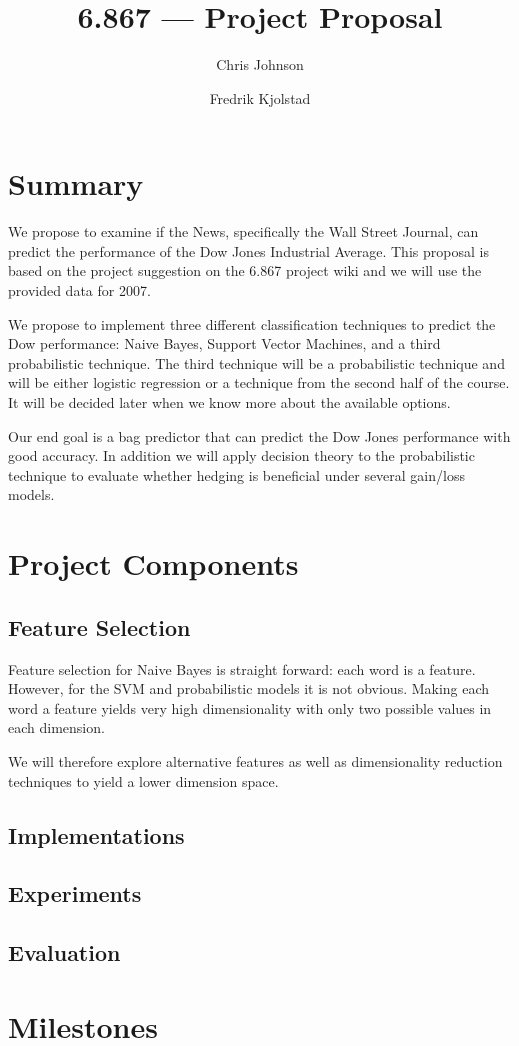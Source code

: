 \documentclass[10pt]{article}
\begin{document}
\title{6.867 --- Project Proposal}
\author{Chris Johnson \and Fredrik Kjolstad}
\date{}
\maketitle

\section{Summary}
We propose to examine if the News, specifically the Wall Street Journal, can predict the performance of the Dow Jones Industrial Average.
This proposal is based on the project suggestion on the 6.867 project wiki and we will use the provided data for 2007.

We propose to implement three different classification techniques to predict the Dow performance: Naive Bayes, Support Vector Machines, and a third probabilistic technique. The third technique will be a probabilistic technique and will be either logistic regression or a technique from the second half of the course.
It will be decided later when we know more about the available options.

Our end goal is a bag predictor that can predict the Dow Jones performance with good accuracy.
In addition we will apply decision theory to the probabilistic technique to evaluate whether hedging is beneficial under several gain/loss models.

\section{Project Components}


\subsection{Feature Selection}
Feature selection for Naive Bayes is straight forward: each word is a feature.
However, for the SVM and probabilistic models it is not obvious.
Making each word a feature yields very high dimensionality with only two possible values in each dimension.

We will therefore explore alternative features as well as dimensionality reduction techniques to yield a lower dimension space.

\subsection{Implementations}


\subsection{Experiments}

\subsection{Evaluation}


\section{Milestones}
\end{document}
